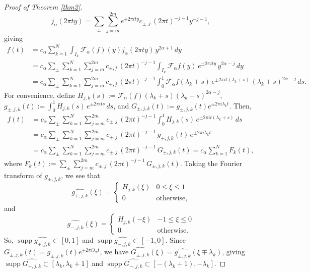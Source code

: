 \documentclass[11pt,a4paper,reqno,dvipsnames]{amsart}
\newcommand{\F}{\mathcal{F}}
\renewcommand{\le}{\leqslant}
\numberwithin{equation}{section}
\theoremstyle{plain}
\theoremstyle{definition}
\theoremstyle{remark}
\begin{document}
\begin{proof}[Proof of Theorem \ref{thm2}]
\begin{equation*}
    j_\alpha(2\pi ty) = \sum_{\pm } \sum_{j=m}^{2m} e^{\pm 2\pi i ty} c_{\pm, j}\, (2\pi t)^{-j-1} y^{-j-1},
\end{equation*}
giving
\begin{align*}
    f(t) &= c_\alpha \sum_{k=1}^N \int_{I_k} \F_\alpha(f)(y) j_\alpha(2\pi ty)\,  y^{2\alpha +1}\, dy\\
    &= c_\alpha\sum_{\pm} \sum_{k=1}^N \sum_{j=m}^{2m} c_{\pm, j}\, (2\pi t)^{-j-1} \int_{I_k} \F_\alpha f(y)\,  e^{\pm 2\pi i ty}\,  y^{2\alpha - j}\, dy\\
    &= c_\alpha \sum_{\pm} \sum_{k=1}^N \sum_{j=m}^{2m} c_{\pm, j}\, (2\pi t)^{-j-1} \int_{0}^1 \F_\alpha f(\lambda_k + s)\,  e^{\pm 2\pi i t(\lambda_k + s)}\,  (\lambda_k + s)^{2\alpha - j}\, ds. 
\end{align*}
For convenience, define $H_{j,k}(s) := \F_\alpha (f)(\lambda_k + s) (\lambda_k + s)^{2\alpha - j}$, $g_{\pm, j, k}(t) := \int_0^1 H_{j,k}(s)\, e^{\pm 2\pi i ts}\, ds$, and $G_{\pm, j, k}(t) := g_{\pm, j, k}(t) e^{\pm 2\pi i\lambda_k t}$. Then,
\begin{align*}
    f(t) &= c_\alpha \sum_{\pm} \sum_{k=1}^N \sum_{j=m}^{2m} c_{\pm, j}\, (2\pi t)^{-j-1} \int_{0}^1 H_{j,k}(s)\,  e^{\pm 2\pi i t(\lambda_k + s)}\, ds\\
    &= c_\alpha \sum_{\pm} \sum_{k=1}^N \sum_{j=m}^{2m} c_{\pm, j}\, (2\pi t)^{-j-1}\,  g_{\pm, j,k}(t) \, e^{\pm 2\pi i\lambda_k t}\\
    &= c_\alpha \sum_{\pm} \sum_{k=1}^N \sum_{j=m}^{2m} c_{\pm, j}\, (2\pi t)^{-j-1} \, G_{\pm, j,k}(t) = c_\alpha \sum_{k=1}^N F_k(t),
\end{align*}
where $F_k(t) := \sum_{\pm} \sum_{j=m}^{2m} c_{\pm, j}\, (2\pi t)^{-j-1} \, G_{\pm, j,k}(t)$. Taking the Fourier transform of $g_{\pm,j,k}$, we see that
$$\widehat{g_{+,j,k}}(\xi) = \begin{cases} H_{j,k}(\xi) & 0\le \xi \le 1\\ 0 & \text{otherwise}, \end{cases}$$
and
$$\widehat{g_{-,j,k}}(\xi) = \begin{cases} H_{j,k}(-\xi) & -1\le \xi \le 0\\ 0 & \text{otherwise}. \end{cases}$$
So, $\operatorname{supp} \widehat{g_{+,j,k}} \subset [0,1]$ and $\operatorname{supp} \widehat{g_{-,j,k}} \subset [-1, 0]$. Since $G_{\pm, j, k}(t) = g_{\pm, j, k}(t) e^{\pm 2\pi i\lambda_k t}$, we have $\widehat{G_{\pm, j, k}}(\xi) = \widehat{g_{\pm, j, k}}(\xi \mp \lambda_k)$, giving $\operatorname{supp} \widehat{G_{+, j, k}} \subset [\lambda_k, \lambda_k + 1]$ and $\operatorname{supp} \widehat{G_{-, j, k}} \subset [-(\lambda_k +1 ), -\lambda_k]$.


\end{proof}
\end{document}
